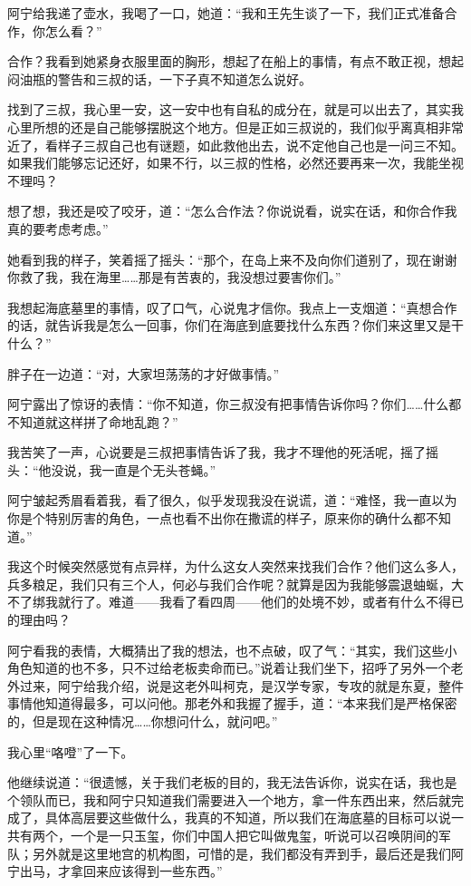 阿宁给我递了壶水，我喝了一口，她道：“我和王先生谈了一下，我们正式准备合作，你怎么看？”

合作？我看到她紧身衣服里面的胸形，想起了在船上的事情，有点不敢正视，想起闷油瓶的警告和三叔的话，一下子真不知道怎么说好。

找到了三叔，我心里一安，这一安中也有自私的成分在，就是可以出去了，其实我心里所想的还是自己能够摆脱这个地方。但是正如三叔说的，我们似乎离真相非常近了，看样子三叔自己也有谜题，如此救他出去，说不定他自己也是一问三不知。如果我们能够忘记还好，如果不行，以三叔的性格，必然还要再来一次，我能坐视不理吗？

想了想，我还是咬了咬牙，道：“怎么合作法？你说说看，说实在话，和你合作我真的要考虑考虑。”

她看到我的样子，笑着摇了摇头：“那个，在岛上来不及向你们道别了，现在谢谢你救了我，我在海里……那是有苦衷的，我没想过要害你们。”

我想起海底墓里的事情，叹了口气，心说鬼才信你。我点上一支烟道：“真想合作的话，就告诉我是怎么一回事，你们在海底到底要找什么东西？你们来这里又是干什么？”

胖子在一边道：“对，大家坦荡荡的才好做事情。”

阿宁露出了惊讶的表情：“你不知道，你三叔没有把事情告诉你吗？你们……什么都不知道就这样拼了命地乱跑？”

我苦笑了一声，心说要是三叔把事情告诉了我，我才不理他的死活呢，摇了摇头：“他没说，我一直是个无头苍蝇。”

阿宁皱起秀眉看着我，看了很久，似乎发现我没在说谎，道：“难怪，我一直以为你是个特别厉害的角色，一点也看不出你在撒谎的样子，原来你的确什么都不知道。”

我这个时候突然感觉有点异样，为什么这女人突然来找我们合作？他们这么多人，兵多粮足，我们只有三个人，何必与我们合作呢？就算是因为我能够震退蚰蜒，大不了绑我就行了。难道——我看了看四周——他们的处境不妙，或者有什么不得已的理由吗？

阿宁看我的表情，大概猜出了我的想法，也不点破，叹了气：“其实，我们这些小角色知道的也不多，只不过给老板卖命而已。”说着让我们坐下，招呼了另外一个老外过来，阿宁给我介绍，说是这老外叫柯克，是汉学专家，专攻的就是东夏，整件事情他知道得最多，可以问他。那老外和我握了握手，道：“本来我们是严格保密的，但是现在这种情况……你想问什么，就问吧。”

我心里“咯噔”了一下。

他继续说道：“很遗憾，关于我们老板的目的，我无法告诉你，说实在话，我也是个领队而已，我和阿宁只知道我们需要进入一个地方，拿一件东西出来，然后就完成了，具体高层要这些做什么，我真的不知道，所以我们在海底墓的目标可以说一共有两个，一个是一只玉玺，你们中国人把它叫做鬼玺，听说可以召唤阴间的军队；另外就是这里地宫的机构图，可惜的是，我们都没有弄到手，最后还是我们阿宁出马，才拿回来应该得到一些东西。”

